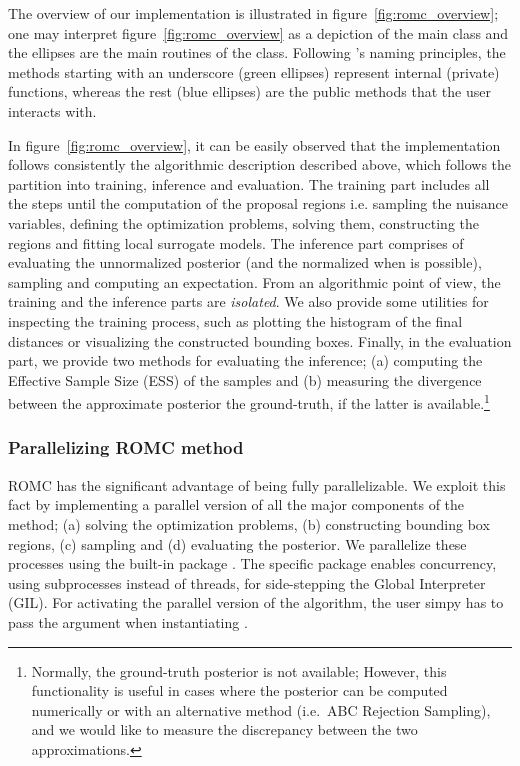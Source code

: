 

The overview of our implementation is illustrated in
figure~\ref{fig:romc_overview}; one may interpret
figure~\ref{fig:romc_overview} as a depiction of the main class and
the ellipses are the main routines of the class. Following
's naming principles, the methods starting with an
underscore (green ellipses) represent internal (private) functions,
whereas the rest (blue ellipses) are the public methods that the user
interacts with.

In figure~\ref{fig:romc_overview}, it can be easily observed that the
implementation follows consistently the algorithmic description
described above, which follows the partition into training, inference
and evaluation. The training part includes all the steps until the
computation of the proposal regions i.e. sampling the nuisance
variables, defining the optimization problems, solving them,
constructing the regions and fitting local surrogate models. The
inference part comprises of evaluating the unnormalized posterior (and
the normalized when is possible), sampling and computing an
expectation. From an algorithmic point of view, the training and the
inference parts are \emph{isolated}. We also provide some utilities
for inspecting the training process, such as plotting the histogram of
the final distances or visualizing the constructed bounding
boxes. Finally, in the evaluation part, we provide two methods for
evaluating the inference; (a) computing the Effective Sample Size
(ESS) of the samples and (b) measuring the divergence between the
approximate posterior the ground-truth, if the latter is
available.\footnote{Normally, the ground-truth posterior is not
  available; However, this functionality is useful in cases where the
  posterior can be computed numerically or with an alternative method
  (i.e.\ ABC Rejection Sampling), and we would like to measure the
  discrepancy between the two approximations.}

\subsubsection*{Parallelizing ROMC method}

ROMC has the significant advantage of being fully parallelizable. We
exploit this fact by implementing a parallel version of all the major
components of the method; (a) solving the optimization problems, (b)
constructing bounding box regions, (c) sampling and (d) evaluating the
posterior. We parallelize these processes using the built-in
 package . The specific package
enables concurrency, using subprocesses instead of threads, for
side-stepping the Global Interpreter (GIL). For activating the
parallel version of the algorithm, the user simpy has to pass the
argument  when instantiating .

